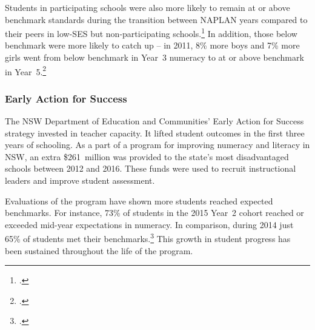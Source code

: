 \documentclass{grattan}
\begin{document}
Students in participating schools were also more likely to remain at or above benchmark standards during the transition between NAPLAN years compared to their peers in low-SES but non-participating schools.\footcite{CIRES2015LowSESSchool} \citetrackertrue
In addition, those below benchmark were more likely to catch up -- in 2011, 8\% more boys and 7\% more girls went from below benchmark in Year~3 numeracy to at or above benchmark in Year~5.\footcite[][ix]{CIRES2015LowSESSchool}

\subsubsection{Early Action for Success}\label{subsubsec:early-action-for-success}

The NSW Department of Education and Communities' Early Action for Success strategy invested in teacher capacity.
It lifted student outcomes in the first three years of schooling.
As a part of a program for improving numeracy and literacy in NSW, an extra \$261~million was provided to the state's most disadvantaged schools between 2012 and 2016.
These funds were used to recruit instructional leaders and improve student assessment.

Evaluations of the program have shown more students reached expected benchmarks.
For instance, 73\% of students in the 2015 Year~2 cohort reached or exceeded mid-year expectations in numeracy.
In comparison, during 2014 just 65\% of students met their benchmarks.\footcite[][5]{Education2015EarlyActionSuccess}
This growth in student progress has been sustained throughout the life of the program.
\end{document}
